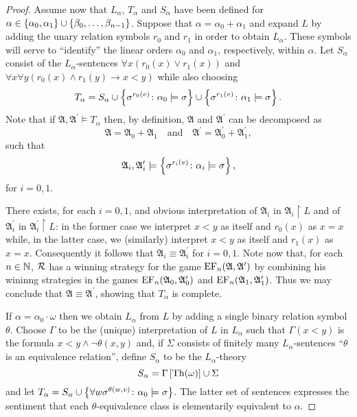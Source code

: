 \begin{proof}
	Assume now that $L_\alpha$, $T_\alpha$ and $S_\alpha$ have been defined for $\alpha\in\left\lbrace \alpha_0,\alpha_1\right\rbrace\cup\left\lbrace \beta_0,\dotsc,\beta_{n-1}\right\rbrace$.  Suppose that $\alpha=\alpha_0+\alpha_1$ and expand $L$ by adding the unary relation symbols $r_0$ and $r_1$ in order to obtain $L_\alpha$.  These symbols will serve to ``identify'' the linear orders $\alpha_0$ and $\alpha_1$, respectively, within $\alpha$.  Let $S_\alpha$ consist of the $L_\alpha$-sentences $\forall x(r_0(x)\vee r_1(x))$ and $\forall x\forall y(r_0(x)\wedge r_1(y)\rightarrow x<y)$ while also choosing
	\begin{equation}
		T_\alpha=S_\alpha\cup\left\lbrace \sigma^{r_0(v)}\colon \alpha_0\models\sigma \right\rbrace\cup\left\lbrace \sigma^{r_1(v)}\colon \alpha_1\models\sigma \right\rbrace.
	\end{equation}
	Note that if $\mathfrak{A},\mathfrak{A}^\prime\models T_\alpha$ then, by definition, $\mathfrak{A}$ and $\mathfrak{A}^\prime$ can be decomposed as
	\begin{equation}
		\mathfrak{A}=\mathfrak{A}_0+\mathfrak{A}_1 \quad\text{and}\quad \mathfrak{A}^\prime=\mathfrak{A}^\prime_0+\mathfrak{A}^\prime_1,
	\end{equation}
	such that
	\begin{equation}
		\mathfrak{A}_i,\mathfrak{A}^\prime_i\models\left\lbrace \sigma^{r_i(v)}\colon \alpha_i\models\sigma \right\rbrace,
	\end{equation}
	for $i=0,1$.

	There exists, for each $i=0,1$, and obvious interpretation of $\mathfrak{A}_i$ in $\mathfrak{A}_i\restriction L$ and of $\mathfrak{A}^\prime_i$ in $\mathfrak{A}^\prime_i\restriction L$: in the former case we interpret $x<y$ as itself and $r_0(x)$ as $x=x$ while, in the latter case, we (similarly) interpret $x<y$ as itself and $r_1(x)$ as $x=x$.  Consequently it follows that $\mathfrak{A}_i\equiv\mathfrak{A}^\prime_i$ for $i=0,1$.  Note now that, for each $n\in\mathbb{N}$, $\mathcal{R}$ has a winning strategy for the game $\operatorname{EF}_n(\mathfrak{A},\mathfrak{A}^\prime)$ by combining his wininng strategies in the games $\operatorname{EF}_n(\mathfrak{A}_0,\mathfrak{A}^\prime_0)$ and $\operatorname{EF}_n(\mathfrak{A}_1,\mathfrak{A}^\prime_1)$.  Thus we may conclude that $\mathfrak{A}\equiv\mathfrak{A}^\prime$, showing that $T_\alpha$ is complete.

	If $\alpha=\alpha_0\cdot\omega$ then we obtain $L_\alpha$ from $L$ by adding a single binary relation symbol $\theta$.  Choose $\Gamma$ to be the (unique) interpretation of $L$ in $L_\alpha$ such that $\Gamma(x<y)$ is the formula $x<y\wedge\neg\theta(x,y)$ and, if $\Sigma$ consists of finitely many $L_\alpha$-sentences ``$\theta$ is an equivalence relation'', define $S_\alpha$ to be the $L_\alpha$-theory
	\begin{equation}
		S_\alpha=\Gamma\left[\operatorname{Th}(\omega)\right]\cup\Sigma
	\end{equation}
	and let $T_\alpha=S_\alpha\cup\left\lbrace \forall w\sigma^{\theta(w,v)}\colon \alpha_0\models\sigma \right\rbrace$.  The latter set of sentences expresses the sentiment that each $\theta$-equivalence class is elementarily equivalent to $\alpha$.


\end{proof}

